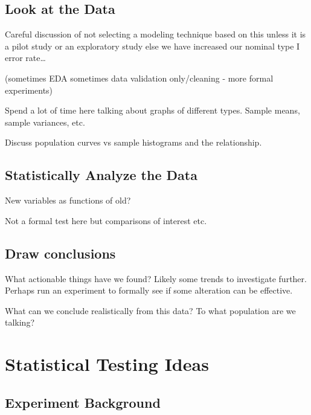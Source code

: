 \documentclass[]{book}
\begin{document}
\hypertarget{look-at-the-data}{%
\subsection{Look at the Data }\label{look-at-the-data}}

Careful discussion of not selecting a modeling technique based on this unless it is a pilot study or an exploratory study else we have increased our nominal type I error rate\ldots{}

(sometimes EDA sometimes data validation only/cleaning - more formal experiments)

Spend a lot of time here talking about graphs of different types. Sample means, sample variances, etc.

Discuss population curves vs sample histograms and the relationship.

\hypertarget{statistically-analyze-the-data}{%
\subsection{Statistically Analyze the Data}\label{statistically-analyze-the-data}}

New variables as functions of old?

Not a formal test here but comparisons of interest etc.

\hypertarget{draw-conclusions}{%
\subsection{Draw conclusions}\label{draw-conclusions}}

What actionable things have we found? Likely some trends to investigate further. Perhaps run an experiment to formally see if some alteration can be effective.

What can we conclude realistically from this data? To what population are we talking?

\hypertarget{statistical-testing-ideas}{%
\section{Statistical Testing Ideas}\label{statistical-testing-ideas}}

\hypertarget{experiment-background-1}{%
\subsection{Experiment Background}\label{experiment-background-1}}
\end{document}
